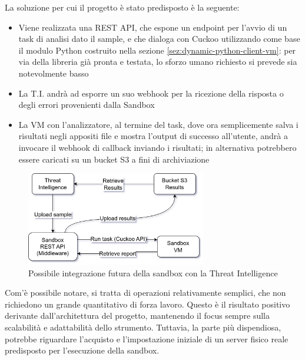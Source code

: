 La soluzione per cui il progetto è stato predisposto è la seguente:
\begin{itemize}
    \item Viene realizzata una REST API, che espone un endpoint per l'avvio di un task di analisi dato il sample, e che dialoga con Cuckoo utilizzando come base il modulo Python costruito nella sezione \ref{sez:dynamic-python-client-vm}: per via della libreria già pronta e testata, lo sforzo umano richiesto si prevede sia notevolmente basso
    \item La T.I. andrà ad esporre un suo webhook per la ricezione della risposta o degli errori provenienti dalla Sandbox
    \item La VM con l'analizzatore, al termine del task, dove ora semplicemente salva i risultati negli appositi file e mostra l'output di successo all'utente, andrà a invocare il webhook di callback inviando i risultati; in alternativa potrebbero essere caricati su un bucket S3 a fini di archiviazione
\end{itemize}

\begin{figure}[htbp]
    \centering
    \includegraphics[width=0.7\textwidth]{assets/future_dynamic_ti_integration.png}
    \caption{Possibile integrazione futura della sandbox con la Threat Intelligence}
    \label{fig:future_dynamic_ti_integration}
\end{figure}

Com'è possibile notare, si tratta di operazioni relativamente semplici, che non richiedono un grande quantitativo di forza lavoro.
Questo è il risultato positivo derivante dall'architettura del progetto, mantenendo il focus sempre sulla scalabilità e adattabilità dello strumento.
Tuttavia, la parte più dispendiosa, potrebbe riguardare l'acquisto e l'impostazione iniziale di un server fisico reale predisposto per l'esecuzione della sandbox.


